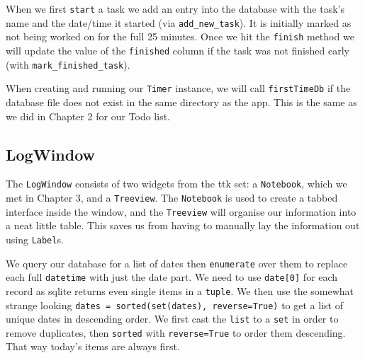 \documentclass[a4paper,11pt,openany]{book}
\begin{document}
When we first \lstinline[columns=fixed]{start} a task we add an entry into the database with the task's name and the date/time it started (via \lstinline[columns=fixed]{add_new_task}). It is initially marked as not being worked on for the full 25 minutes. Once we hit the \lstinline[columns=fixed]{finish} method we will update the value of the \lstinline[columns=fixed]{finished} column if the task was not finished early (with \lstinline[columns=fixed]{mark_finished_task}).

\vspace{5mm}

When creating and running our \lstinline[columns=fixed]{Timer} instance, we will call \lstinline[columns=fixed]{firstTimeDb} if the database file does not exist in the same directory as the app. This is the same as we did in Chapter 2 for our Todo list. 

\subsection{LogWindow}

The \lstinline[columns=fixed]{LogWindow} consists of two widgets from the ttk set: a \lstinline[columns=fixed]{Notebook}, which we met in Chapter 3, and a \lstinline[columns=fixed]{Treeview}. The \lstinline[columns=fixed]{Notebook} is used to create a tabbed interface inside the window, and the \lstinline[columns=fixed]{Treeview} will organise our information into a neat little table. This saves us from having to manually lay the information out using \lstinline[columns=fixed]{Label}s.

\vspace{5mm}

We query our database for a list of dates then \lstinline[columns=fixed]{enumerate} over them to replace each full \lstinline[columns=fixed]{datetime} with just the date part. We need to use \lstinline[columns=fixed]{date[0]} for each record as sqlite returns even single items in a \lstinline[columns=fixed]{tuple}. We then use the somewhat strange looking \lstinline[columns=fixed]{dates = sorted(set(dates), reverse=True)} to get a list of unique dates in descending order. We first cast the \lstinline[columns=fixed]{list} to a \lstinline[columns=fixed]{set} in order to remove duplicates, then \lstinline[columns=fixed]{sorted} with \lstinline[columns=fixed]{reverse=True} to order them descending. That way today's items are always first. 

\vspace{5mm}
\end{document}
